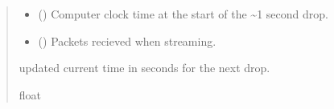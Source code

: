 \documentclass[letterpaper,10pt,english]{sphinxmanual}
\begin{document}
\begin{fulllineitems}
\begin{fulllineitems}
\begin{quote}
\begin{description}
\begin{itemize}
\item {} 
\sphinxAtStartPar
{} () \textendash{} Computer clock time at the start of the \textasciitilde{}1 second drop.

\item {} 
\sphinxAtStartPar
{} (\sphinxstyleliteralemphasis{\sphinxupquote{{[}}}{\hyperref[\detokenize{PodApi.Packets:PodApi.Packets.Packet.Packet}]{\sphinxcrossref{\sphinxstyleliteralemphasis{\sphinxupquote{Packet}}}}}\sphinxstyleliteralemphasis{\sphinxupquote{ | }}\sphinxstyleliteralemphasis{\sphinxupquote{{]}}}) \textendash{} Packets recieved when streaming.

\end{itemize}

\sphinxAtStartPar
updated current time in seconds for the next drop.

\sphinxAtStartPar
float

\end{description}\end{quote}

\end{fulllineitems}



\end{fulllineitems}
\end{document}
